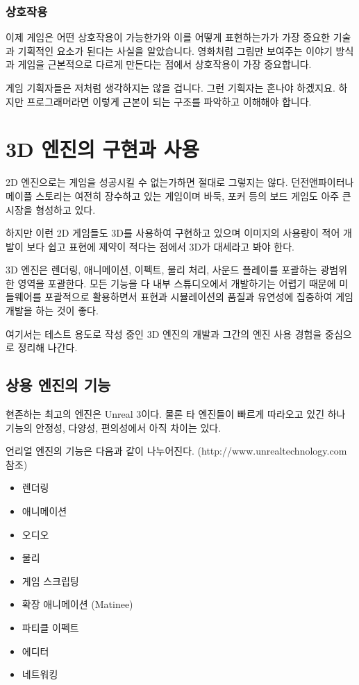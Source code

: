 \documentclass[chapter,kosection, 10.5pt, romanfixed, a4paper]{oblivoir}
\begin{document}
\subsection{상호작용}

이제 게임은 어떤 상호작용이 가능한가와 이를 어떻게 표현하는가가 가장 중요한 기술과 기획적인 요소가 된다는
사실을 알았습니다. 영화처럼 그림만 보여주는 이야기 방식과 게임을 근본적으로 다르게 만든다는 점에서 
상호작용이 가장 중요합니다. 


게임 기획자들은 저처럼 생각하지는 않을 겁니다. 그런 기획자는 혼나야 하겠지요. 하지만 프로그래머라면
이렇게 근본이 되는 구조를 파악하고 이해해야 합니다. 


\chapter{3D 엔진의 구현과 사용}

2D 엔진으로는 게임을 성공시킬 수 없는가하면 절대로 그렇지는 않다. 던전앤파이터나 메이플 스토리는
여전히 장수하고 있는 게임이며 바둑, 포커 등의 보드 게임도 아주 큰 시장을 형성하고 있다. 

하지만 이런 2D 게임들도 3D를 사용하여 구현하고 있으며 이미지의 사용량이 적어 개발이 보다 쉽고 
표현에 제약이 적다는 점에서 3D가 대세라고 봐야 한다. 

3D 엔진은 렌더링, 애니메이션, 이펙트, 물리 처리, 사운드 플레이를 포괄하는 광범위한 영역을 
포괄한다. 모든 기능을 다 내부 스튜디오에서 개발하기는 어렵기 때문에 미들웨어를 포괄적으로 
활용하면서 표현과 시뮬레이션의 품질과 유연성에 집중하여 게임 개발을 하는 것이 좋다. 

여기서는 테스트 용도로 작성 중인 3D 엔진의 개발과 그간의 엔진 사용 경험을 중심으로 정리해 나간다. 

\section{상용 엔진의 기능}

현존하는 최고의 엔진은 Unreal 3이다. 물론 타 엔진들이 빠르게 따라오고 있긴 하나 기능의 
안정성, 다양성, 편의성에서 아직 차이는 있다. 

언리얼 엔진의 기능은 다음과 같이 나누어진다. (http://www.unrealtechnology.com 참조)
\begin{itemize}
\item 렌더링 
\item 애니메이션
\item 오디오 
\item 물리 
\item 게임 스크립팅
\item 확장 애니메이션 (Matinee)
\item 파티클 이펙트
\item 에디터 
\item 네트워킹
\end{itemize}
\end{document}
